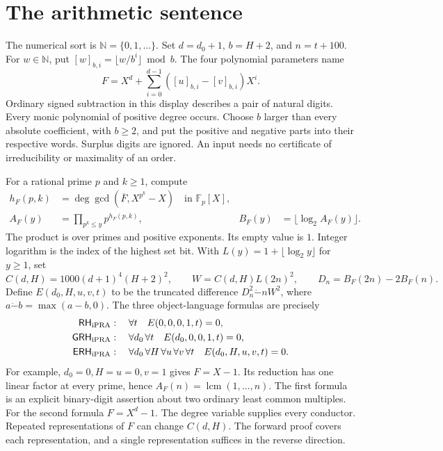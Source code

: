 \documentclass[11pt]{article}
\newcommand{\N}{\mathbb N}\newcommand{\Z}{\mathbb Z}\newcommand{\Q}{\mathbb Q}\newcommand{\F}{\mathbb F}
\newcommand{\ip}{\mathrm{iPRA}}\newcommand{\code}[1]{\texttt{\detokenize{#1}}}
\begin{document}


\newpage
\section{The arithmetic sentence}\label{sec:sentence}
The numerical sort is \(\N=\{0,1,\ldots\}\). Set \(d=d_0+1\), \(b=H+2\), and \(n=t+100\). For \(w\in\N\), put \([w]_{b,i}=\lfloor w/b^i\rfloor\bmod b\). The four polynomial parameters name
\[
 F=X^d+\sum_{i=0}^{d-1}([u]_{b,i}-[v]_{b,i})X^i .
\]
Ordinary signed subtraction in this display describes a pair of natural digits. Every monic polynomial of positive degree occurs. Choose \(b\) larger than every absolute coefficient, with \(b\ge2\), and put the positive and negative parts into their respective words. Surplus digits are ignored. An input needs no certificate of irreducibility or maximality of an order.

For a rational prime \(p\) and \(k\ge1\), compute
\begin{align}
 h_F(p,k)&=\deg\gcd(\overline F,X^{p^k}-X)\quad\text{in }\F_p[X],\label{eq:h}\\
 A_F(y)&=\prod_{p^k\le y}p^{h_F(p,k)},&
 B_F(y)&=\lfloor\log_2 A_F(y)\rfloor .\label{eq:A}
\end{align}
The product is over primes and positive exponents. Its empty value is \(1\). Integer logarithm is the index of the highest set bit. With \(L(y)=1+\lfloor\log_2 y\rfloor\) for \(y\ge1\), set
\[
 C(d,H)=1000(d+1)^4(H+2)^2,\qquad
 W=C(d,H)L(2n)^2,\qquad D_n=B_F(2n)-2B_F(n).
\]
Define \(E(d_0,H,u,v,t)\) to be the truncated difference \(D_n^2\mathbin{\dot-}nW^2\), where \(a\mathbin{\dot-}b=\max(a-b,0)\). The three object-language formulas are precisely
\begin{align*}
 \RH_{\ip}  &:\quad \forall t\quad E(0,0,0,1,t)=0,\\
 \GRH_{\ip} &:\quad \forall d_0\,\forall t\quad E(d_0,0,0,1,t)=0,\\
 \ERH_{\ip} &:\quad \forall d_0\,\forall H\,\forall u\,\forall v\,\forall t
                    \quad E(d_0,H,u,v,t)=0 .
\end{align*}
For example, \(d_0=0,H=u=0,v=1\) gives \(F=X-1\). Its reduction has one linear factor at every prime, hence \(A_F(n)=\operatorname{lcm}(1,\ldots,n)\). The first formula is an explicit binary-digit assertion about two ordinary least common multiples. For the second formula \(F=X^d-1\). The degree variable supplies every conductor. Repeated representations of \(F\) can change \(C(d,H)\). The forward proof covers each representation, and a single representation suffices in the reverse direction.
\end{document}
